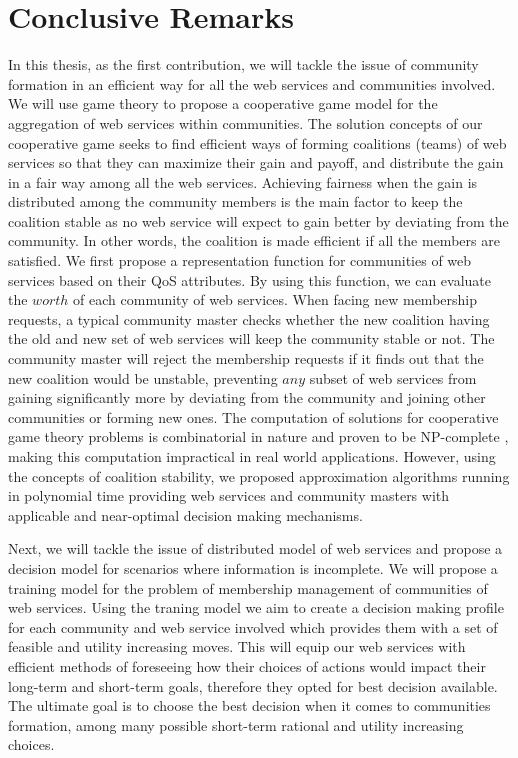 \section{Conclusive Remarks}

In this thesis, as the first contribution, we will tackle the issue of community formation in an efficient way for all the web services and communities involved. We will use game theory to propose a cooperative game model for the aggregation of web services within communities. The solution concepts of our cooperative game seeks to find efficient ways of forming coalitions (teams) of web services so that they can maximize their gain and payoff, and distribute the gain in a fair way among all the web services. Achieving fairness when the gain is distributed among the community members is the main factor to keep the coalition stable as no web service will expect to gain better by deviating from the community. In other words, the coalition is made efficient if all the members are satisfied. We first propose a representation function for communities of web services based on their QoS attributes. By using this function, we can evaluate the $worth$ of each community of web services. When facing new membership requests, a typical community master checks whether the new coalition having the old and new set of web services will keep the community stable or not. The community master will reject the membership requests if it finds out that the new coalition would be unstable, preventing $any$ subset of web services from gaining significantly more by deviating from the community and joining other communities or forming new ones. The computation of solutions for cooperative game theory problems is combinatorial in nature and proven to be NP-complete \cite{Algorithmic}, making this computation impractical in real world applications. However, using the concepts of coalition stability, we proposed approximation algorithms running in polynomial time providing web services and community masters with applicable and near-optimal decision making mechanisms.

Next, we will tackle the issue of distributed model of web services and propose a decision model for scenarios where information is incomplete. We will propose a training model for the problem of membership management of communities of web services. Using the traning model we aim to create a decision making profile for each community and web service involved which provides them with a set of feasible and utility increasing moves. This will equip our web services with efficient methods of foreseeing how their choices of actions would impact their long-term and short-term goals, therefore they opted for best decision available. The ultimate goal is to choose the best decision when it comes to communities formation, among many possible short-term rational and utility increasing choices. 

